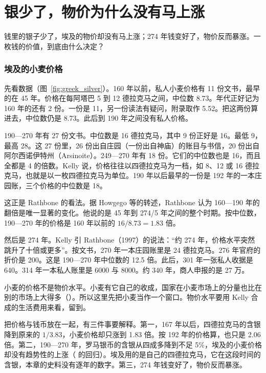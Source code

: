 \section{银少了，物价为什么没有马上涨}\label{sec:greek-prices}

钱里的银子少了，埃及的物价却没有马上涨；274 年钱变好了，物价反而暴涨。一枚钱的价值，到底由什么决定？

\subsubsection{埃及的小麦价格}
先看数据（图~\ref{fig:greek_silver}）。160 年以前，私人小麦价格有 11 份文书，最早的在 45 年。价格在每阿塔巴 5 到 12 德拉克马之间，中位数 8.73。年代正好记为 160 年的还有 2 份。一份是 11，另一份读法有疑问，附录取作 5.52。把这两份算进去，中位数仍是 8.73。此后到 190 年之间没有私人价格。

190—270 年有 27 份文书。中位数是 16 德拉克马，其中 9 份正好是 16。最低 9，最高 28。这 27 份里，26 份出自庄园（一份出自神庙）的账目与书信，20 份出自阿尔西诺伊特州（Arsinoite）\cite{kelly2021}。249—270 年有 18 份。它们的中位数也是 16，而且全都是 4 的倍数。Kelly 说，价格往往以四德拉克马为一档，如 8、12 或 16 德拉克马\cite{kelly2021}，也就是以一枚四德拉克马为单位。190 年以后最早的一份是 192 年的一本庄园账，三个价格的中位数是 18。

这正是 Rathbone 的看法。据 Howgego 等的转述，Rathbone 认为 160—190 年的翻倍是唯一显著的变化。他说的是 45 年到 274/5 年之间的整个时期\cite{howgego2010}。按中位数，190—270 年的价格是 160 年以前的 $16/8.73=1.83$ 倍。

然后是 274 年。Kelly 引 Rathbone（1997）\cite{rathbone1997}的说法：“约 274 年，价格水平突然跳升了十倍或更多”\cite{kelly2021}。按文书，270 年一本庄园账里是 24 德拉克马。276 年官府的折价是 200。这是 190—270 年中位数的 12.5 倍。此后，301 年一张私人收据是 640。314 年一本私人账里是 6000 与 8000。约 340 年，商人申报的是 27 万\cite{kelly2021}。

小麦的价格不是物价水平。小麦有它自己的收成，国家在小麦市场上的分量也比在别的市场上大得多（）。所以这里先把小麦当作一个窗口。物价水平要用 Kelly 合成的生活费用来看，留到。

把价格与钱币放在一起，有三件事要解释。第一，167 年以后，四德拉克马的含银降到原来的 $1/3.83$，小麦价格却只涨到 1.83 倍。按 192 年的价格算，也只是 2.06 倍。第二，190—270 年，罗马银币的含银从四成多降到不足 5\%，埃及的小麦价格却没有趋势性的上涨（ 的回归）。埃及用的是自己的四德拉克马，它在这段时间的含银，本章的史料没有逐年的数字。第三，274 年钱变好了，物价反而暴涨。

